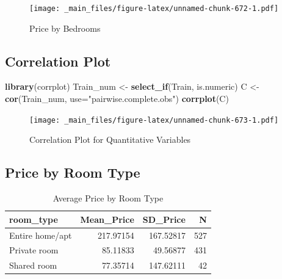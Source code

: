 \documentclass[]{book}
\newenvironment{Shaded}{\begin{snugshade}}{\end{snugshade}}
\newcommand{\KeywordTok}[1]{\textcolor[rgb]{0.13,0.29,0.53}{\textbf{#1}}}
\newcommand{\DataTypeTok}[1]{\textcolor[rgb]{0.13,0.29,0.53}{#1}}
\newcommand{\StringTok}[1]{\textcolor[rgb]{0.31,0.60,0.02}{#1}}
\newcommand{\OperatorTok}[1]{\textcolor[rgb]{0.81,0.36,0.00}{\textbf{#1}}}
\newcommand{\NormalTok}[1]{#1}
\begin{document}
\begin{figure}
\centering
\texttt{[image: \_main\_files/figure-latex/unnamed-chunk-672-1.pdf]}
\caption{\label{fig:unnamed-chunk-672}Price by Bedrooms}
\end{figure}

\subsection{Correlation Plot}\label{correlation-plot}

\begin{Shaded}
\begin{Highlighting}[]
\KeywordTok{library}\NormalTok{(corrplot)}
\NormalTok{Train_num <-}\StringTok{ }\KeywordTok{select_if}\NormalTok{(Train, is.numeric)}
\NormalTok{C <-}\StringTok{ }\KeywordTok{cor}\NormalTok{(Train_num, }\DataTypeTok{use=}\StringTok{"pairwise.complete.obs"}\NormalTok{)}
\KeywordTok{corrplot}\NormalTok{(C)}
\end{Highlighting}
\end{Shaded}

\begin{figure}
\centering
\texttt{[image: \_main\_files/figure-latex/unnamed-chunk-673-1.pdf]}
\caption{\label{fig:unnamed-chunk-673}Correlation Plot for Quantitative
Variables}
\end{figure}

\subsection{Price by Room Type}\label{price-by-room-type}

\begin{Shaded}
\end{Shaded}

\begin{table}

\caption{\label{tab:unnamed-chunk-674}Average Price by Room Type}
\centering
\begin{tabular}[t]{l|r|r|r}
\hline
room\_type & Mean\_Price & SD\_Price & N\\
\hline
Entire home/apt & 217.97154 & 167.52817 & 527\\
\hline
Private room & 85.11833 & 49.56877 & 431\\
\hline
Shared room & 77.35714 & 147.62111 & 42\\
\hline
\end{tabular}
\end{table}
\end{document}
